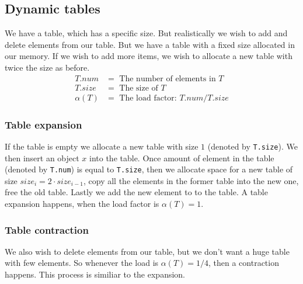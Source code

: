 \subsection*{Dynamic tables}
We have a table, which has a specific size. But realistically we wish to add and
delete elements from our table. But we have a table with a fixed size allocated
in our memory. If we wish to add more items, we wish to allocate a new table
with twice the size as before.
\begin{align*}
  T.num&=\textrm{ The number of elements in }T\\
  T.size&=\textrm{ The size of }T\\
  \alpha(T)&=\textrm{ The load factor: }T.num/T.size
\end{align*}
\subsubsection*{Table expansion}
If the table is empty we allocate a new table with size $1$ (denoted by
\texttt{T.size}). We then insert an object $x$ into the table. Once amount of
element in the table (denoted by \texttt{T.num}) is equal to \texttt{T.size},
then we allocate space for a new table of size $size_i=2\cdot size_{i-1}$, copy
all the elements in the former table into the new one, free the old table.
Lastly we add the new element to to the table. A table expansion happens, when
the load factor is $\alpha(T)=1$.
\subsubsection*{Table contraction}
We also wish to delete elements from our table, but we don't want a huge table
with few elements. So whenever the load is $\alpha(T)=1/4$, then a contraction
happens. This process is similiar to the expansion.

